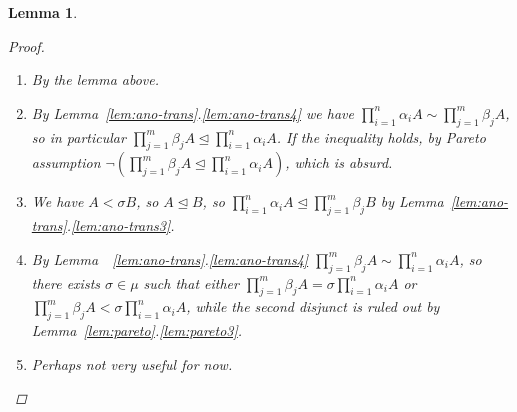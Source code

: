 \documentclass[11pt]{article}
\newtheorem{lemma}[definition]{Lemma}
\newcommand{\releq}{\mathrel{\trianglelefteq}}
\begin{document}
\begin{lemma}
\begin{proof}
\begin{enumerate}
  \item By the lemma above.
  
 
  \item By Lemma~\ref{lem:ano-trans}.\ref{lem:ano-trans4} we have  $\prod_{i =1}^n \alpha_i A \sim \prod_{j =1}^m \beta_j A$, so in particular $\prod_{j =1}^m \beta_j A \releq \prod_{i =1}^n \alpha_i A$. If the inequality holds, by Pareto assumption $\neg(\prod_{j =1}^m \beta_j A \releq \prod_{i =1}^n \alpha_i A )$, which is absurd.

  
  \item We have $A < \sigma B$, so $A \releq B$, so $\prod_{i =1}^n \alpha_i A \releq \prod_{j =1}^m \beta_j B$ by Lemma~\ref{lem:ano-trans}.\ref{lem:ano-trans3}.
  
  \item By Lemma~~\ref{lem:ano-trans}.\ref{lem:ano-trans4} $\prod_{j =1}^m \beta_j A \sim \prod_{i =1}^n \alpha_i A$, so there exists $\sigma \in \mu$ such that either $\prod_{j =1}^m \beta_j A = \sigma \prod_{i =1}^n \alpha_i A$ or $\prod_{j =1}^m \beta_j A < \sigma \prod_{i =1}^n \alpha_i A$, while the second disjunct is ruled out by Lemma~\ref{lem:pareto}.\ref{lem:pareto3}.
  
    
  \item Perhaps not very useful for now.

 \end{enumerate}
\end{proof}
\end{lemma}
\end{document}
